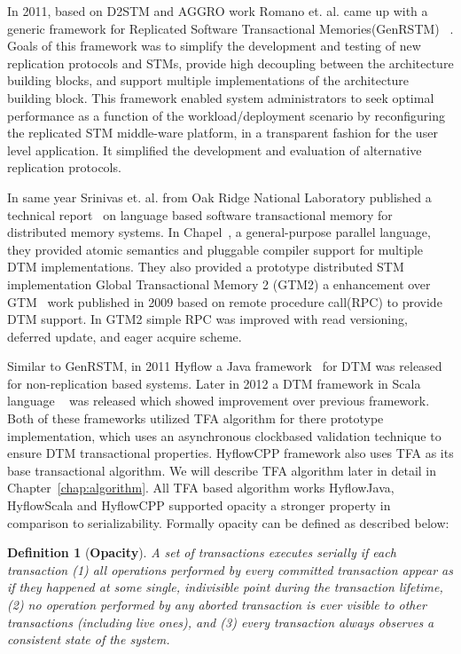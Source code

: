 \documentclass[12pt,english]{report}
\newtheorem{definition}{Definition}[section]
\begin{document}
In 2011, based on D2STM and AGGRO work Romano et. al. came up with a generic framework for Replicated Software Transactional Memories(GenRSTM) ~\cite{GenRSTM:6038614}. Goals of this framework was to simplify the development and testing of new replication protocols and STMs, provide high decoupling between the architecture building blocks, and support multiple implementations of the architecture building block. This framework enabled system administrators to seek optimal performance as a function of the workload/deployment scenario by reconfiguring the replicated STM middle-ware platform, in a transparent fashion for the
user level application. It simplified the development and evaluation of alternative replication protocols.

In same year Srinivas et. al. from Oak Ridge National Laboratory published a technical report~\cite{sridharan2011scalable} on language based software transactional memory for distributed memory systems. In Chapel~\cite{chapel:Language}, a general-purpose parallel language, they provided atomic semantics and pluggable compiler support for multiple DTM implementations. They also provided a prototype distributed STM implementation Global Transactional Memory 2 (GTM2) a enhancement over GTM~\cite{sridharan2009scalable} work published in 2009 based on remote procedure call(RPC) to provide DTM  support. In GTM2 simple RPC was improved with read versioning, deferred update, and eager acquire scheme.

Similar to GenRSTM, in 2011 Hyflow a Java framework~\cite{Saad:2011:HHP:1996130.1996167} for DTM was released for non-replication based systems. Later in 2012 a DTM framework in Scala language ~\cite{turcuhyflow2}  was released which showed improvement over previous framework. Both of these frameworks utilized TFA algorithm for there prototype implementation, which uses an asynchronous clockbased validation technique to ensure DTM transactional properties. HyflowCPP framework also uses TFA as its base transactional algorithm. We will describe TFA algorithm later in detail in Chapter~\ref{chap:algorithm}. All TFA based algorithm works HyflowJava, HyflowScala and HyflowCPP supported opacity a stronger property in comparison to serializability.   Formally opacity can be defined as described below:

\begin{definition}[\textbf{Opacity}]
A set of transactions executes serially if each transaction 
(1) all operations performed by every committed transaction
appear as if they happened at some single, indivisible point during
the transaction lifetime, (2) no operation performed by any
aborted transaction is ever visible to other transactions (including
live ones), and (3) every transaction always observes a consistent
state of the system.~\cite{Guerraoui:2008:CTM:1345206.1345233}
\end{definition}
\end{document}
